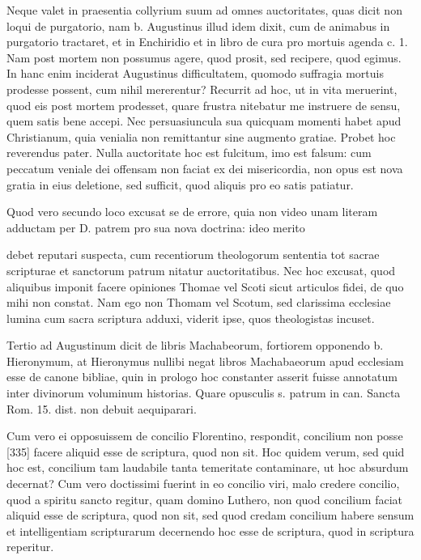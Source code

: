 Neque valet in praesentia collyrium suum ad omnes auctoritates, quas dicit non loqui de purgatorio, nam b. Augustinus illud idem dixit, cum de animabus in purgatorio tractaret, et in Enchiridio et in libro de cura pro mortuis agenda c. 1. Nam post mortem non possumus agere, quod prosit, sed recipere, quod egimus. In hanc enim inciderat Augustinus difficultatem, quomodo suffragia mortuis prodesse possent, cum nihil mererentur? Recurrit ad hoc, ut in vita meruerint, quod eis post mortem prodesset, quare frustra nitebatur me instruere de sensu, quem satis bene accepi. Nec persuasiuncula sua quicquam momenti habet apud Christianum, quia venialia non remittantur sine augmento gratiae. Probet hoc reverendus pater. Nulla auctoritate hoc est fulcitum, imo est falsum: cum peccatum veniale dei offensam non faciat ex dei misericordia, non opus est nova gratia in eius deletione, sed sufficit, quod aliquis pro eo satis patiatur.

Quod vero secundo loco excusat se de errore, quia non video unam literam adductam per D. patrem pro sua nova doctrina: ideo merito

debet reputari suspecta, cum recentiorum theologorum sententia tot sacrae scripturae et sanctorum patrum nitatur auctoritatibus. Nec hoc excusat, quod aliquibus imponit facere opiniones Thomae vel Scoti sicut articulos fidei, de quo mihi non constat. Nam ego non Thomam vel Scotum, sed clarissima ecclesiae lumina cum sacra scriptura adduxi, viderit ipse, quos theologistas incuset.

Tertio ad Augustinum dicit de libris Machabeorum, fortiorem opponendo b. Hieronymum, at Hieronymus nullibi negat libros Machabaeorum apud ecclesiam esse de canone bibliae, quin in prologo hoc constanter asserit fuisse annotatum inter divinorum voluminum historias. Quare opusculis s. patrum in can. Sancta Rom. 15. dist. non debuit aequiparari.

Cum vero ei opposuissem de concilio Florentino, respondit, concilium non posse [335] facere aliquid esse de scriptura, quod non sit. Hoc quidem verum, sed quid hoc est, concilium tam laudabile tanta temeritate contaminare, ut hoc absurdum decernat? Cum vero doctissimi fuerint in eo concilio viri, malo credere concilio, quod a spiritu sancto regitur, quam domino Luthero, non quod concilium faciat aliquid esse de scriptura, quod non sit, sed quod credam concilium habere sensum et intelligentiam scripturarum decernendo hoc esse de scriptura, quod in scriptura reperitur.

